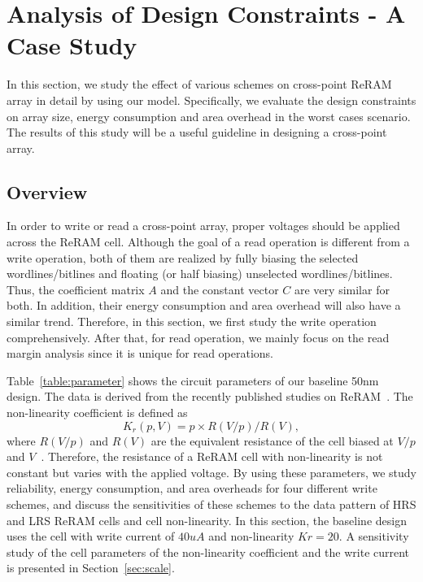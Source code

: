 \vspace{-4pt}
\section{Analysis of Design Constraints - A Case Study}\label{sec:w_and_r}

In this section, we study the effect of various schemes on cross-point
ReRAM array in detail by using our model. Specifically, we
evaluate the design constraints on array size, energy consumption and area
overhead in the worst cases scenario. The results of this study will be a
useful guideline in designing a cross-point array.

\vspace{-10pt}
\subsection{Overview}
In order to write or read a cross-point array, proper voltages should be
applied across the ReRAM cell. Although the goal of a read operation is
different from a write operation, both of them are realized by fully
biasing the selected wordlines/bitlines and floating (or half biasing)
unselected wordlines/bitlines. Thus, the coefficient matrix $A$ and the
constant vector $C$ are very similar for both. In addition, their energy
consumption and area overhead will also have a similar trend. Therefore,
in this section, we first study the write operation comprehensively. After
that, for read operation, we mainly focus on the read margin analysis
since it is unique for read operations.

Table~\ref{table:parameter} shows the circuit parameters of our baseline
50nm design. The data is derived from the recently published studies on
ReRAM~\cite{ReRAM_overview,memristor:Cong,ReRAM_Renesas}. The
non-linearity coefficient is defined as
\begin{equation}
K_r(p,V) = p \times R(V/p)/R(V),
\end{equation}
where $R(V/p)$ and $R(V)$ are the equivalent resistance of the cell biased
at $V/p$ and $V$~\cite{memristor:Cong}. Therefore, the resistance of a
ReRAM cell with non-linearity is not constant but varies with the applied
voltage. By using these parameters, we study reliability, energy
consumption, and area overheads for four different write schemes, and
discuss the sensitivities of these schemes to the data pattern of HRS and
LRS ReRAM cells and cell non-linearity. In this section, the baseline
design uses the cell with write current of $40 uA$ and non-linearity
$Kr=20$. A sensitivity study of the cell parameters of the non-linearity
coefficient and the write current is presented in Section~\ref{sec:scale}.


